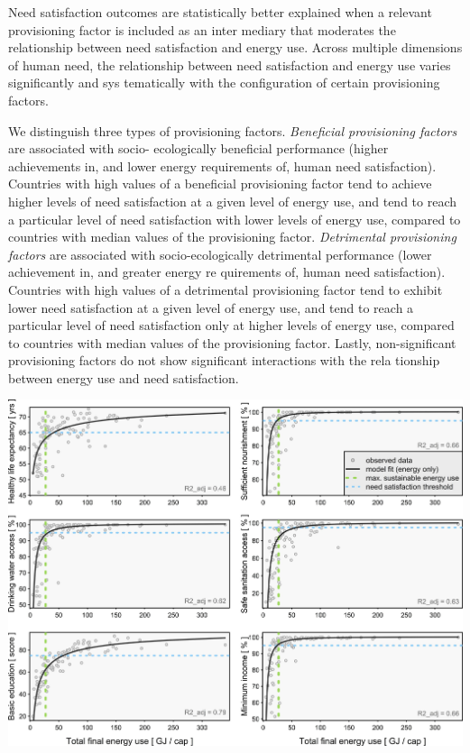 \documentclass[
]{book}
\begin{document}
Need satisfaction outcomes are statistically better
explained when a relevant provisioning factor is included as an inter­
mediary that moderates the relationship between need satisfaction and
energy use. Across multiple dimensions of human need, the relationship
between need satisfaction and energy use varies significantly and sys­
tematically with the configuration of certain provisioning factors.

We distinguish three types of provisioning factors.
\emph{Beneficial provisioning factors} are associated with socio-
ecologically beneficial performance (higher achievements in, and lower
energy requirements of, human need satisfaction). Countries with high
values of a beneficial provisioning factor tend to achieve higher levels of
need satisfaction at a given level of energy use, and tend to reach a
particular level of need satisfaction with lower levels of energy use,
compared to countries with median values of the provisioning factor.
\emph{Detrimental provisioning factors} are associated with socio-ecologically
detrimental performance (lower achievement in, and greater energy re­
quirements of, human need satisfaction). Countries with high values of a
detrimental provisioning factor tend to exhibit lower need satisfaction at
a given level of energy use, and tend to reach a particular level of need
satisfaction only at higher levels of energy use, compared to countries
with median values of the provisioning factor. Lastly, non-significant
provisioning factors do not show significant interactions with the rela­
tionship between energy use and need satisfaction.

\includegraphics{fig/Vogel_fig2.jpg}
\end{document}
